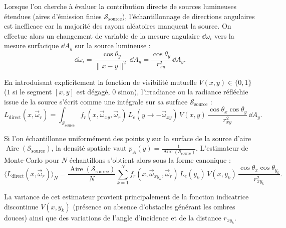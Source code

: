 \begin{proposition}
    Lorsque l'on cherche à évaluer la contribution directe de sources lumineuses étendues (aires d'émission finies $\mathcal{S}_{\text{source}}$), l'échantillonnage de directions angulaires est inefficace car la majorité des rayons aléatoires manquent la source. On effectue alors un changement de variable de la mesure angulaire $\dd\omega_i$ vers la mesure surfacique $\dd A_y$ sur la source lumineuse :
    \begin{equation}
        \dd\omega_i = \frac{\cos\theta_y}{\|x - y\|^2} \, \dd A_y = \frac{\cos\theta_y}{r_{xy}^2} \, \dd A_y.
    \end{equation}

    En introduisant explicitement la fonction de visibilité mutuelle $V(x, y) \in \{0, 1\}$ ($1$ si le segment $[x, y]$ est dégagé, $0$ sinon), l'irradiance ou la radiance réfléchie issue de la source s'écrit comme une intégrale sur sa surface $\mathcal{S}_{\text{source}}$ :
    \begin{equation}
        L_{\text{direct}}(x, \vec{\omega}_r) = \int_{\mathcal{S}_{\text{source}}} f_r(x, \vec{\omega}_{xy}, \vec{\omega}_r) \, L_e(y \to -\vec{\omega}_{xy}) \, V(x, y) \, \frac{\cos\theta_x \cos\theta_y}{r_{xy}^2} \, \dd A_y.
    \end{equation}

    Si l'on échantillonne uniformément des points $y$ sur la surface de la source d'aire $\operatorname{Aire}(\mathcal{S}_{\text{source}})$, la densité spatiale vaut $p_A(y) = \frac{1}{\operatorname{Aire}(\mathcal{S}_{\text{source}})}$. L'estimateur de Monte-Carlo pour $N$ échantillons s'obtient alors sous la forme canonique :
    \begin{equation}
        \boxed{\langle L_{\text{direct}}(x, \vec{\omega}_r) \rangle_N = \frac{\operatorname{Aire}(\mathcal{S}_{\text{source}})}{N} \sum_{k=1}^N f_r(x, \vec{\omega}_{x y_k}, \vec{\omega}_r) \, L_e(y_k) \, V(x, y_k) \, \frac{\cos\theta_x \cos\theta_{y_k}}{r_{x y_k}^2}}.
    \end{equation}
\end{proposition}

La variance de cet estimateur provient principalement de la fonction indicatrice discontinue $V(x, y_k)$ (présence ou absence d'obstacles générant les ombres douces) ainsi que des variations de l'angle d'incidence et de la distance $r_{x y_k}$.


